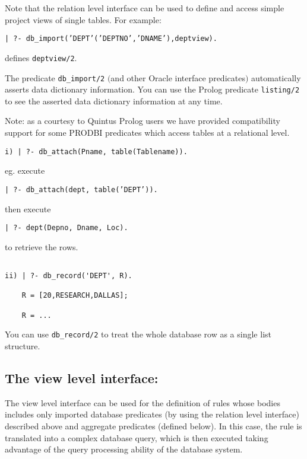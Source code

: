 Note that the relation level interface can be used to define and
access simple project views of single tables.  For example:
\begin{center}

{\tt | ?- db\_import('DEPT'('DEPTNO','DNAME'),deptview).}
\end{center}
defines {\tt deptview/2}.

The predicate {\tt db\_import/2} $($and other Oracle interface
predicates$)$ automatically asserts data dictionary information.  You
can use the Prolog predicate {\tt listing/2} to see the asserted data
dictionary information at any time.  


Note: as a courtesy to Quintus Prolog users we have provided
compatibility support for some PRODBI predicates which access tables
at a relational level.

\begin{verbatim}
i) | ?- db_attach(Pname, table(Tablename)).
\end{verbatim}

eg. execute 
\begin{center}
{\tt | ?- db\_attach(dept, table('DEPT')).} 
\end{center}
then execute 
\begin{center}	
{\tt | ?- dept(Depno, Dname, Loc).}
\end{center}
to retrieve the rows.
\begin{verbatim}

ii) | ?- db_record('DEPT', R).

    R = [20,RESEARCH,DALLAS];

    R = ...

\end{verbatim}
    You can use {\tt db\_record/2} to treat the whole database row as a single list structure.



\subsection{The view level interface:}



   The view level interface can be used for the definition of rules
whose bodies includes only imported database predicates (by using the
relation level interface) described above and aggregate predicates
(defined below).  In this case, the rule is translated into a complex
database query, which is then executed taking advantage of the query
processing ability of the database system.

